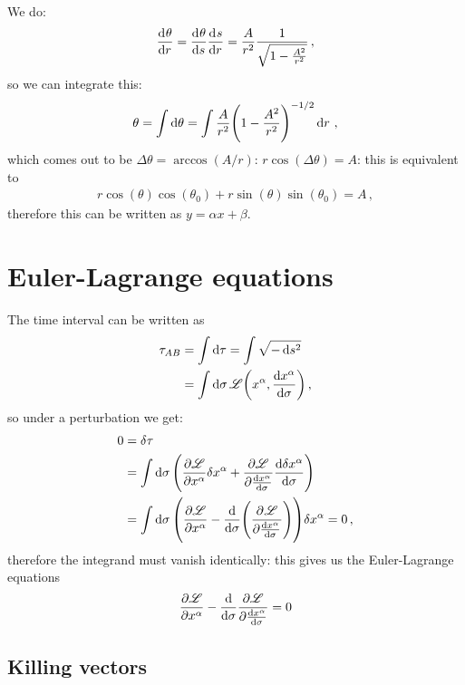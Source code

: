 \documentclass[main.tex]{subfiles}
\begin{document}
We do: 
%
\begin{align}
  \dv[]{\theta }{r} = \dv[]{\theta }{s} \dv[]{s}{r} = \frac{A}{r^2} \frac{1}{\sqrt{1- \frac{A^2}{r^2}}}
\,,
\end{align}
%
so we can integrate this: 
%
\begin{align}
  \theta  = \int \dd{\theta } = \int
  \frac{A}{r^2} \qty(1 - \frac{A^2}{r^2})^{-1/2} \dd{r}
\,,
\end{align}
%
which comes out to be \(\Delta \theta  = \arccos (A/r)\): \(r\cos(\Delta \theta ) = A \): this is equivalent to 
%
\begin{align}
  r \cos(\theta ) \cos(\theta_0 ) + r \sin(\theta ) \sin(\theta_0 ) = A
\,,
\end{align}
%
therefore this can be written as \(y = \alpha x + \beta \).

\section{Euler-Lagrange equations}

The time interval can be written as 
%
\begin{align}
  \tau_{AB} &= \int \dd{\tau } = \int \sqrt{-\dd{s^2}}  \\
  &= \int  \dd{\sigma } \mathscr{L} \qty(x^{\alpha }, \dv{x^{\alpha }}{\sigma }) 
\,,
\end{align}
%
so under a perturbation we get: 
%
\begin{align}
  0 &= \delta \tau \\
  &= \int  \dd{\sigma } \qty(
      \pdv{\mathscr{L}}{x^{\alpha }} \delta x^{\alpha } 
      + \pdv{\mathscr{L}}{\dv{x^{\alpha }}{\sigma }} 
      \dv{ \delta x^{\alpha }}{\sigma }
  )  \\
  &= \int  \dd{\sigma } 
  \qty(
      \pdv{\mathscr{L}}{x^{\alpha }} - \dv{}{\sigma } \qty(\pdv[]{\mathscr{L}}{\dv{x^{\alpha }}{\sigma }})
  ) \delta x^{\alpha } =0
\,,
\end{align}
%
therefore the integrand must vanish identically: this gives us the Euler-Lagrange equations 
%
\begin{align}
  \pdv{\mathscr{L}}{x^{\alpha }} 
  - \dv{}{\sigma } 
  \pdv{\mathscr{L}}{\dv{x^{\alpha}}{\sigma }}=0
\end{align}

\subsection{Killing vectors}
\end{document}
